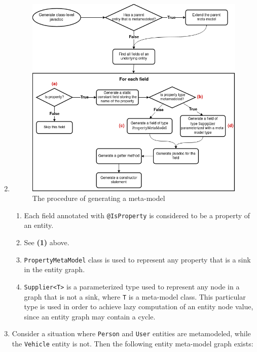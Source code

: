 \begin{enumerate}[label={\textbf{(\arabic*)*}}]
\setcounter{enumi}{1}
    \item \;
        \begin{figure}[H]\centering
            \includegraphics[scale=0.55]{images/meta-model-algorithm.drawio.png}
            \caption{The procedure of generating a meta-model}\label{fig:meta-model_algorithm}
        \end{figure}

        \begin{enumerate}[label={\textbf{(\alph*)}}]
            \item Each field annotated with \texttt{@IsProperty} is considered to be a property of an entity.
            \item See \textbf{(1)} above.
            \item \texttt{PropertyMetaModel} class is used to represent any property that is a sink in the entity graph.
            \item \texttt{Supplier<T>} is a parameterized type used to represent any node in a graph that is not a sink, where \texttt{T} is a meta-model class. This particular type is used in order to achieve lazy computation of an entity node value, since an entity graph may contain a cycle.
        \end{enumerate}

    \addtocounter{enumi}{1}
    \item Consider a situation where \texttt{Person} and \texttt{User} entities are metamodeled, while the \texttt{Vehicle} entity is not. Then the following entity meta-model graph exists:


\end{enumerate}
